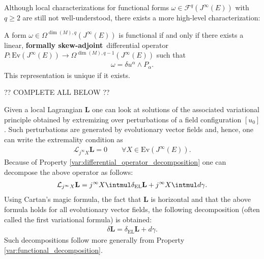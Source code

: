     Although local characterizations for functional forms $\omega\in\mathcal{F}^q(J^\infty(E))$ with $q\geq2$ are still not well-understood, there exists a more high-level characterization:
    \begin{property}[Characterization]
        A form $\omega\in\Omega^{\dim(M),q}(J^\infty(E))$ is functional if and only if there exists a linear, \textbf{formally skew-adjoint}\footnotemark\ differential operator $P:\mathrm{Ev}(J^\infty(E))\rightarrow\Omega^{\dim(M),q-1}(J^\infty(E))$ such that
        \begin{gather}
            \omega = \delta u^\alpha\wedge P_\alpha.
        \end{gather}
        This representation is unique if it exists.
    \end{property}

    ?? COMPLETE ALL BELOW ??
    \begin{property}
        Given a local Lagrangian $\mathbf{L}$ one can look at solutions of the associated variational principle obtained by extremizing over perturbations of a field configuration $[u_0]$. Such perturbations are generated by evolutionary vector fields and, hence, one can write the extremality condition as
        \begin{gather}
            \mathcal{L}_{j^\infty X}\mathbf{L} = 0 \qquad \forall X\in\mathrm{Ev}(J^\infty(E)).
        \end{gather}
        Because of Property \ref{var:differential_operator_decomposition} one can decompose the above operator as follows:
        \begin{gather}
            \mathcal{L}_{j^\infty X}\mathbf{L} = j^\infty X\intmul\delta_\mathrm{EL}\mathbf{L} + j^\infty X\intmul d\gamma.
        \end{gather}
        Using Cartan's magic formula, the fact that $\mathbf{L}$ is horizontal and that the above formula holds for all evolutionary vector fields, the following decomposition (often called the first variational formula) is obtained:
        \begin{gather}
            \label{var:first_variational_formula}
            \delta\mathbf{L} = \delta_\mathrm{EL}\mathbf{L} + d\gamma.
        \end{gather}
        Such decompositions follow more generally from Property \ref{var:functional_decomposition}.
    \end{property}

